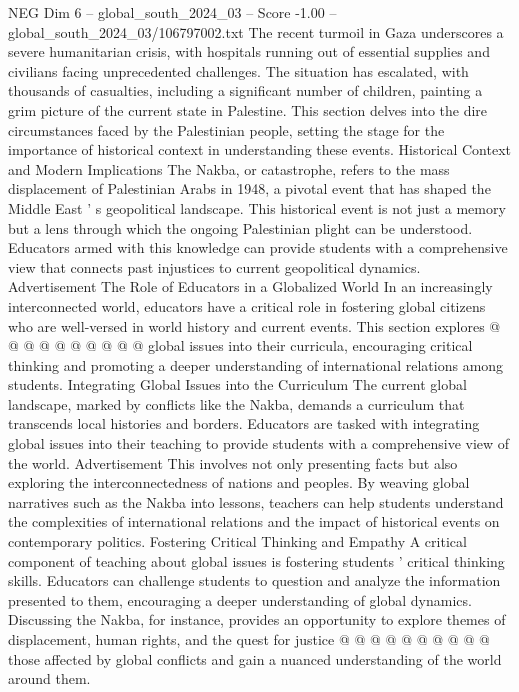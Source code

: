 \begin{textsample}{NEG Dim 6 – global\_south\_2024\_03 – Score -1.00 – global\_south\_2024\_03/106797002.txt}  \label{ex:f6_neg_408}
The recent turmoil in Gaza underscores a severe humanitarian crisis, with hospitals running out of essential supplies and civilians facing unprecedented challenges.
The situation has escalated, with thousands of casualties, including a significant number of children, painting a grim picture of the current state in Palestine.
This section delves into the dire circumstances faced by the Palestinian people, setting the stage for the importance of historical context in understanding these events.
Historical Context and Modern Implications The Nakba, or catastrophe, refers to the mass displacement of Palestinian Arabs in 1948, a pivotal event that has shaped the Middle East ' s geopolitical landscape.
This historical event is not just a memory but a lens through which the ongoing Palestinian plight can be understood.
Educators armed with this knowledge can provide students with a comprehensive view that connects past injustices to current geopolitical dynamics.
Advertisement The Role of Educators in a Globalized World In an increasingly interconnected world, educators have a critical role in fostering global citizens who are well-versed in world history and current events.
This section explores @ @ @ @ @ @ @ @ @ @ global issues into their curricula, encouraging critical thinking and promoting a deeper understanding of international relations among students.
Integrating Global Issues into the Curriculum The current global landscape, marked by conflicts like the Nakba, demands a curriculum that transcends local histories and borders.
Educators are tasked with integrating global issues into their teaching to provide students with a comprehensive view of the world.
Advertisement This involves not only presenting facts but also exploring the interconnectedness of nations and peoples.
By weaving global narratives such as the Nakba into lessons, teachers can help students understand the complexities of international relations and the impact of historical events on contemporary politics.
Fostering Critical Thinking and Empathy A critical component of teaching about global issues is fostering students ' critical thinking skills.
Educators can challenge students to question and analyze the information presented to them, encouraging a deeper understanding of global dynamics.
Discussing the Nakba, for instance, provides an opportunity to explore themes of displacement, human rights, and the quest for justice @ @ @ @ @ @ @ @ @ @ those affected by global conflicts and gain a nuanced understanding of the world around them.

\end{textsample}
